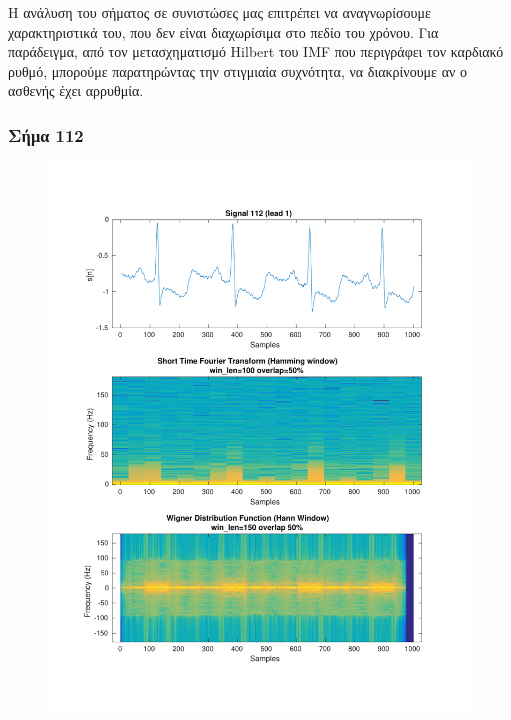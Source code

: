 \documentclass[11pt,a4paper]{article}
\begin{document}
Η ανάλυση του σήματος σε συνιστώσες μας επιτρέπει να αναγνωρίσουμε χαρακτηριστικά του, που δεν είναι διαχωρίσιμα στο πεδίο του χρόνου. Για παράδειγμα, από τον μετασχηματισμό Hilbert του IMF που περιγράφει τον καρδιακό ρυθμό, μπορούμε παρατηρώντας την στιγμιαία συχνότητα, να διακρίνουμε αν ο ασθενής έχει αρρυθμία.

\subsubsection*{Σήμα 112}

\begin{figure}[H]
\centering
\begin{minipage}{0.48\textwidth}
	\centering
	\includegraphics[width=\textwidth]{fig/112l1_stft_wdf.pdf}
\end{minipage}
\begin{minipage}{0.48\textwidth}
	\centering

\end{minipage}
\end{figure}
\end{document}
